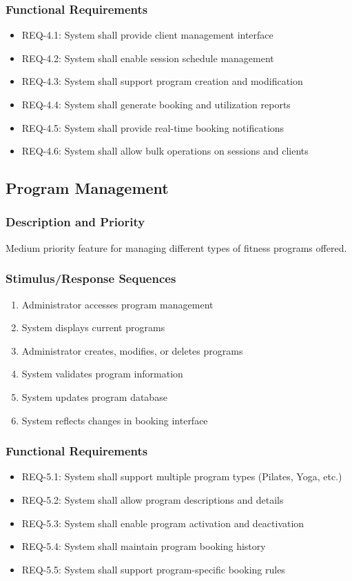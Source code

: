 \documentclass[12pt,a4paper]{article}
\begin{document}
\subsubsection{Functional Requirements}
\begin{itemize}
    \item REQ-4.1: System shall provide client management interface
    \item REQ-4.2: System shall enable session schedule management
    \item REQ-4.3: System shall support program creation and modification
    \item REQ-4.4: System shall generate booking and utilization reports
    \item REQ-4.5: System shall provide real-time booking notifications
    \item REQ-4.6: System shall allow bulk operations on sessions and clients
\end{itemize}

\subsection{Program Management}
\subsubsection{Description and Priority}
Medium priority feature for managing different types of fitness programs offered.

\subsubsection{Stimulus/Response Sequences}
\begin{enumerate}
    \item Administrator accesses program management
    \item System displays current programs
    \item Administrator creates, modifies, or deletes programs
    \item System validates program information
    \item System updates program database
    \item System reflects changes in booking interface
\end{enumerate}

\subsubsection{Functional Requirements}
\begin{itemize}
    \item REQ-5.1: System shall support multiple program types (Pilates, Yoga, etc.)
    \item REQ-5.2: System shall allow program descriptions and details
    \item REQ-5.3: System shall enable program activation and deactivation
    \item REQ-5.4: System shall maintain program booking history
    \item REQ-5.5: System shall support program-specific booking rules
\end{itemize}
\end{document}
